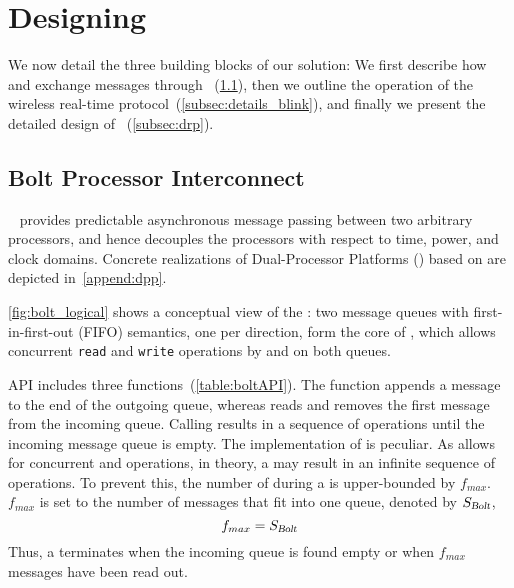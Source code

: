 \section{Designing \DRP}
\label{sec:designDetailed}

We now detail the three building blocks of our solution:
We first describe how \APs and \CPs exchange messages through \bolt~(\cref{subsec:boltAPI}), then we outline the operation of the \blink wireless real-time protocol~(\cref{subsec:details_blink}), and finally we present the detailed design of \DRP~(\cref{subsec:drp}).

\subsection{Bolt Processor Interconnect}
\label{subsec:boltAPI}

\bolt~\cite{sutton2015Bolt} provides predictable asynchronous message passing between two arbitrary processors, and hence decouples the processors with respect to time, power, and clock domains.
Concrete realizations of Dual-Processor Platforms (\DPP) based on \bolt are depicted in~\cref{append:dpp}.

\cref{fig:bolt_logical} shows a conceptual view of the \DPP: two message queues with first-in-first-out (FIFO) semantics, one per direction, form the core of \bolt, which
allows concurrent \texttt{read} and \texttt{write} operations by \ap and \cp on both queues.

\bolt API includes three functions~(\cref{table:boltAPI}).
The \opwrite function appends a message to the end of the outgoing queue, whereas \opread reads and removes the first message from the incoming queue.
Calling \opflush results in a sequence of \opread operations until the incoming message queue is empty.
The implementation of \opflush is peculiar.
As \bolt allows for concurrent \opread and \opwrite operations, in theory, a \opflush may result in an infinite sequence of {\opread} operations.
To prevent this, the number of {\opread} during a \opflush is upper-bounded by $f_{max}$.
$f_{max}$ is set to the number of messages that fit into one \bolt queue, denoted by $S_{\textsl{Bolt}}$,
\begin{equation}
\label{eq:f_max=M}
f_{max} = S_{\textsl{Bolt}}
\end{equation}
Thus, a \opflush terminates when the incoming queue is found empty or when $f_{max}$ messages have been read out.

